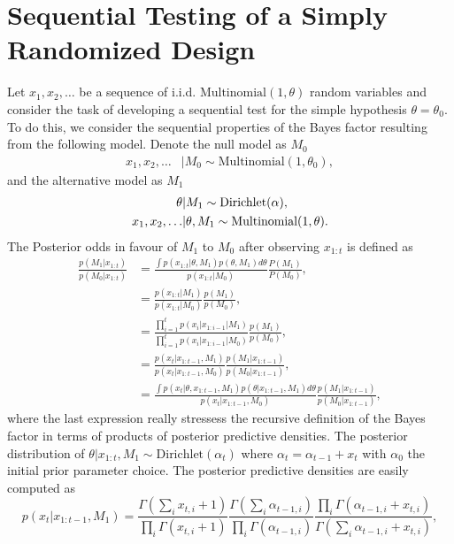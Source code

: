 \documentclass[11pt]{article}
\begin{document}
\section{Sequential Testing of a Simply Randomized Design}
\label{sec:srm_testing}
Let $x_1, x_2 ,\dots $ be a sequence of i.i.d. $\text{Multinomial}(1,\theta)$ random variables and consider the task of developing a sequential test for the simple hypothesis $\theta=\theta_0$. To do this, we consider the sequential properties of the Bayes factor resulting from the following model. Denote the null model as $M_0$ 
\begin{align}
    x_1, x_2, \dots &| M_0 \sim \text{Multinomial}(1,\theta_0),
\end{align}
and the alternative model as $M_1$
\begin{align}
  \theta &| M_1 \sim \text{Dirichlet}(\alpha),\\
  x_1, x_2, \dots &| \theta, M_1 \sim \text{Multinomial}(1,\theta).\notag
\end{align}
The Posterior odds in favour of $M_1$ to $M_0$ after observing $x_{1:t}$ is defined as
\begin{align}
  \label{eq:general_posterior_odds}
  \frac{p(M_1|x_{1:t})}{p(M_0|x_{1:t})}  &= \frac{\int p(x_{1:t}|\theta,M_1)p(\theta,M_1)d\theta}{p(x_{1:t}|M_0)}\frac{P(M_1)}{P(M_0)},\\
                      &=\frac{p(x_{1:t}|M_1)}{p(x_{1:t}|M_0)}\frac{p(M_1)}{p(M_0)},\\
                      &=\frac{\prod_{i=1}^{t}p(x_i|x_{1:i-1}|M_1)}{\prod_{i=1}^{t}p(x_i|x_{1:i-1}|M_0)}\frac{p(M_1)}{p(M_0)},\\
                      &=\frac{p(x_t|x_{1:t-1},M_1)}{p(x_t|x_{1:t-1},M_0)} \frac{p(M_1|x_{1:t-1})}{p(M_0|x_{1:t-1})},\\
    &=\frac{\int p(x_t|\theta,x_{1:t-1},M_1)p(\theta|x_{1:t-1},M_1)d\theta}{p(x_t|x_{1:t-1},M_0)}  \frac{p(M_1|x_{1:t-1})}{p(M_0|x_{1:t-1})} ,
\end{align}
where the last expression really stressess the recursive definition of the Bayes factor in terms of products of posterior predictive densities. The posterior distribution of $\theta| x_{1:t}, M_1 \sim \text{Dirichlet}(\alpha_t)$ where $\alpha_t = \alpha_{t-1}+x_t$ with $\alpha_0$ the initial prior parameter choice. The posterior predictive densities are easily computed as
\begin{equation}
  \label{eq:posterior_predictive_m1}
   p(x_t|x_{1:t-1},M_1) = \frac{ \Gamma(\sum_i x_{t,i}+ 1)}{\prod_i \Gamma(x_{t,i} + 1)} \frac{\Gamma(\sum_i \alpha_{t-1,i})}{\prod_i \Gamma(\alpha_{t-1,i})} \frac{\prod_i \Gamma(\alpha_{t-1,i} + x_{t,i})}{\Gamma(\sum_i \alpha_{t-1,i} + x_{t,i})},
\end{equation}
\end{document}
